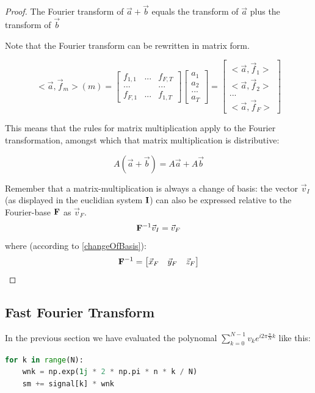 \begin{proof}
    The Fourier transform of $\vec{a} + \vec{b}$ equals the transform of $\vec{a}$ plus the transform of $\vec{b}$

    Note that the Fourier transform can be rewritten in matrix form. 
    
    $$
    <\vec{a}, \vec{f}_m>(m) = 
    \begin{bmatrix} f_{1,1} & ... & f_{F,T} \\ ... & & ... \\ f_{F,1} & ... & f_{1,T}  \end{bmatrix} 
    \begin{bmatrix} a_1 \\ a_2 \\ ... \\ a_T \end{bmatrix}  
    = 
    \begin{bmatrix} <\vec{a}, \vec{f}_1> \\ <\vec{a}, \vec{f}_2> \\ ...  \\ <\vec{a}, \vec{f}_F> \end{bmatrix} 
    $$
    
    This means that the rules for matrix multiplication apply to the Fourier transformation, amongst which that matrix multiplication is distributive:
    
    $$ A (\vec{a} + \vec{b}) = A \vec{a} + A \vec{b} $$
    
    Remember that a matrix-multiplication is always a change of basis: the vector $\vec{v}_I$ (as displayed in the euclidian system $\mathbf{I}$) can also be expressed relative to the Fourier-base $\mathbf{F}$ as $\vec{v}_F$. 
    $$ \mathbf{F}^{-1} \vec{v}_I = \vec{v}_F $$
    where (according to \ref{changeOfBasis}): 
    $$ \mathbf{F}^{-1} = \begin{bmatrix} \vec{x}_F & \vec{y}_F & \vec{z}_F \end{bmatrix} $$
    
\end{proof}


\subsection{Fast Fourier Transform}

In the previous section we have evaluated the polynomal $\sum_{k=0}^{N-1} v_k e^{i 2 \pi \frac{n}{N} k}$ like this:
\begin{lstlisting}[language=python]
for k in range(N):
    wnk = np.exp(1j * 2 * np.pi * n * k / N) 
    sm += signal[k] * wnk
\end{lstlisting}


